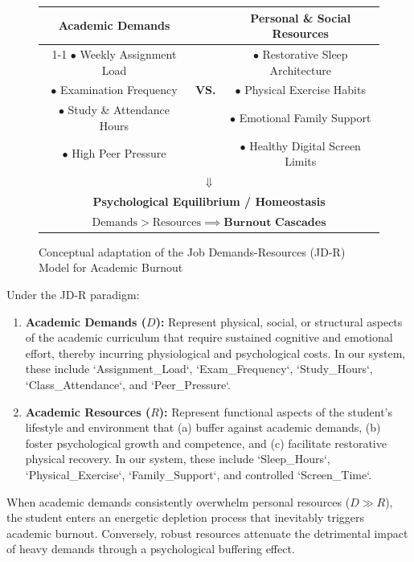 \documentclass[12pt,a4paper,oneside]{report}
\begin{document}
\begin{figure}[H]
\centering
\begin{tabular}{|c|c|c|}
\hline
\textbf{Academic Demands} & & \textbf{Personal \& Social Resources} \\
\cline{1-1} \cline{3-3}
$\bullet$ Weekly Assignment Load & & $\bullet$ Restorative Sleep Architecture \\
$\bullet$ Examination Frequency & \textbf{VS.} & $\bullet$ Physical Exercise Habits \\
$\bullet$ Study \& Attendance Hours & & $\bullet$ Emotional Family Support \\
$\bullet$ High Peer Pressure & & $\bullet$ Healthy Digital Screen Limits \\
\hline
\multicolumn{3}{|c|}{$\Downarrow$} \\
\multicolumn{3}{|c|}{\textbf{Psychological Equilibrium / Homeostasis}} \\
\multicolumn{3}{|c|}{$\text{Demands} > \text{Resources} \implies \textbf{Burnout Cascades}$} \\
\hline
\end{tabular}
\caption{Conceptual adaptation of the Job Demands-Resources (JD-R) Model for Academic Burnout}
\label{fig:jdr_framework}
\end{figure}

Under the JD-R paradigm:
\begin{enumerate}
    \item \textbf{Academic Demands ($D$):} Represent physical, social, or structural aspects of the academic curriculum that require sustained cognitive and emotional effort, thereby incurring physiological and psychological costs. In our system, these include `Assignment\_Load`, `Exam\_Frequency`, `Study\_Hours`, `Class\_Attendance`, and `Peer\_Pressure`.
    \item \textbf{Academic Resources ($R$):} Represent functional aspects of the student's lifestyle and environment that (a) buffer against academic demands, (b) foster psychological growth and competence, and (c) facilitate restorative physical recovery. In our system, these include `Sleep\_Hours`, `Physical\_Exercise`, `Family\_Support`, and controlled `Screen\_Time`.
\end{enumerate}

When academic demands consistently overwhelm personal resources ($D \gg R$), the student enters an energetic depletion process that inevitably triggers academic burnout. Conversely, robust resources attenuate the detrimental impact of heavy demands through a psychological buffering effect.
\end{document}
